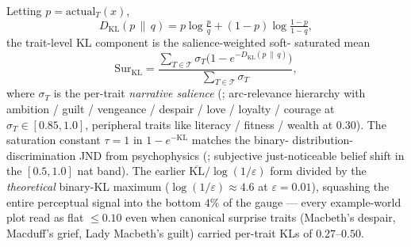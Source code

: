 \documentclass[11pt]{article}
\begin{document}
Letting $p = \mathrm{actual}_T(x)$,
\begin{equation}
D_{\mathrm{KL}}(p \,\|\, q) =
p \log \tfrac{p}{q} + (1-p)\log \tfrac{1-p}{1-q},
\end{equation}
the trait-level KL component is the salience-weighted soft-
saturated mean
\begin{equation}
\label{eq:surprise-saturation}
\mathrm{Sur}_{\mathrm{KL}} = \frac{\sum_{T \in \mathcal{T}} \sigma_T \big(1 - e^{-D_{\mathrm{KL}}(p \,\|\, q)}\big)}{\sum_{T \in \mathcal{T}} \sigma_T},
\end{equation}
where $\sigma_T$ is the per-trait \emph{narrative salience}
(\citealp{reagan2016arcs}; arc-relevance hierarchy with
ambition / guilt / vengeance / despair / love / loyalty /
courage at $\sigma_T \in [0.85, 1.0]$, peripheral traits like
literacy / fitness / wealth at $0.30$). The saturation constant
$\tau = 1$ in $1 - e^{-\mathrm{KL}}$ matches the binary-
distribution-discrimination JND from psychophysics
(\citealp{lu2013visual}; subjective just-noticeable belief
shift in the $[0.5, 1.0]$ nat band). The earlier
$\overline{\mathrm{KL}}/\log(1/\varepsilon)$ form divided by the
\emph{theoretical} binary-KL maximum ($\log(1/\varepsilon) \approx
4.6$ at $\varepsilon = 0.01$), squashing the entire perceptual
signal into the bottom $4\%$ of the gauge --- every example-world
plot read as flat $\le 0.10$ even when canonical surprise traits
(Macbeth's despair, Macduff's grief, Lady Macbeth's guilt)
carried per-trait KLs of $0.27$--$0.50$.
\end{document}
